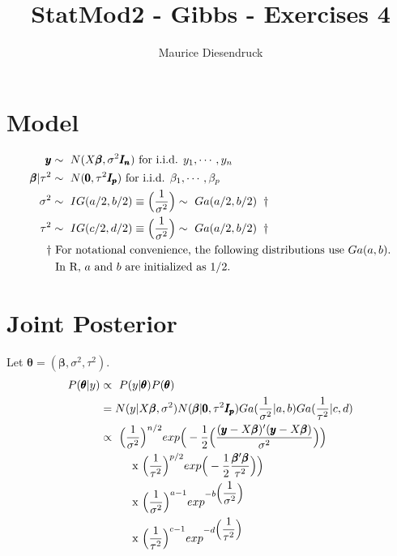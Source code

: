 \documentclass[12pt,letterpaper]{article}
\author{Maurice Diesendruck}
\title{StatMod2 - Gibbs - Exercises 4}
\begin{document}

\maketitle


\section{Model}
\begin{align*}
  \pmb{y} &\sim\ N(X\pmb{\beta}, \sigma^2\pmb{I_n})
		\text{ for i.i.d. } y_1, \cdots, y_n\\
	\pmb{\beta}|\tau^2 &\sim\ N(\pmb{0}, \tau^2\pmb{I_p})
		\text{ for i.i.d. } \beta_1, \cdots, \beta_p\\
	\sigma^2 &\sim\ IG(a/2, b/2) \equiv
		\Big(\frac{1}{\sigma^2} \Big) \sim\ Ga(a/2, b/2) \hspace{2mm}\dagger\\
	\tau^2 &\sim\ IG(c/2, d/2)\equiv
		\Big(\frac{1}{\sigma^2} \Big) \sim\ Ga(a/2, b/2) \hspace{2mm}\dagger\\
	\dagger &\text{ For notational convenience, the following distributions
		use } Ga(a, b){.}\\
		& \text{ In R, } a \text{ and } b \text{ are initialized as 1/2.}
\end{align*}

\section{Joint Posterior}
Let $\pmb{\theta} = (\pmb{\beta}, \sigma^2, \tau^2)$.
\begin{align*}
	P(\pmb{\theta}|y) &\propto\ P(y|\pmb{\theta})P(\pmb{\theta})\\
	&= N(y|X\pmb{\beta},\sigma^2)
		N(\pmb{\beta}|\pmb{0}, \tau^2\pmb{I_p})
		Ga(\dfrac{1}{\sigma^2}|a, b) Ga(\dfrac{1}{\tau^2}|c, d)\\
	&\propto\ \Big( \dfrac{1}{\sigma^2} \Big) ^{n/2} 
		exp \Big( -\frac{1}{2} \Big( \dfrac{(\pmb{y}-X\pmb{\beta})'
			(\pmb{y}-X\pmb{\beta})} {\sigma^2} \Big) \Big)\\
		&\hspace{10mm} \text{x } \Big( \dfrac{1}{\tau^2} \Big) ^{p/2}
			exp \Big( -\frac{1}{2} \dfrac{\pmb{\beta}'\pmb{\beta}}{\tau^2}
			\Big)\Big)\\
		& \hspace{10mm} \text{x } \Big( \dfrac{1}{\sigma^2} \Big) 
			^{a-1} exp^{-b \Big( \dfrac{1}{\sigma^2} \Big)}\\
		& \hspace{10mm} \text{x } \Big( \dfrac{1}{\tau^2} \Big) 
			^{c-1} exp^{-d \Big( \dfrac{1}{\tau^2} \Big)}\\
\end{align*}
\end{document}
